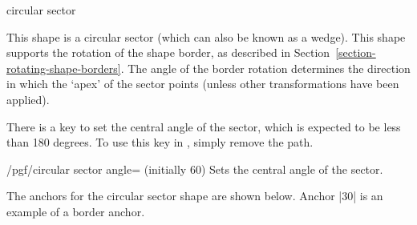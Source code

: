 \begin{shape}{circular sector}

	This shape is a circular sector (which can also be known as a
	wedge).
	This shape supports the rotation of the shape border,
	as described in Section~\ref{section-rotating-shape-borders}.
	The angle of the border rotation determines the direction in which
	the `apex' of the sector points (unless other transformations have
	been applied).
	
\begin{codeexample}[]
\end{codeexample}

	There is a \pgfname{} key to set the central angle of the sector,
	which is expected to be less than 180 degrees.
	To use this key in \tikzname,	simply remove the 
	path.
	
	\begin{key}{/pgf/circular sector angle= (initially 60)}
		Sets the central angle of the sector.
	\end{key}
	
	The anchors for the circular sector shape are shown below.
	Anchor |30| is an example of a border anchor.
	
\begin{codeexample}[]
\Huge
{}
\end{codeexample}
\end{shape}




